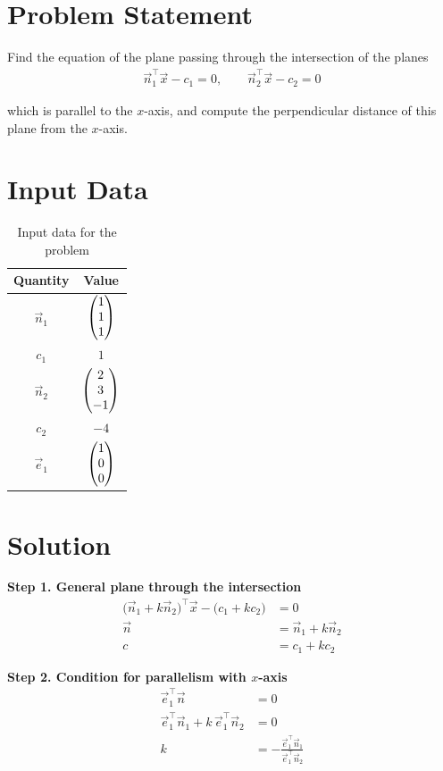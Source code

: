 \documentclass[12pt]{article}
\begin{document}
\section*{Problem Statement}
Find the equation of the plane passing through the intersection of the planes 
\begin{align}
\vec{n}_1^\top \vec{x} - c_1 = 0, 
\qquad
\vec{n}_2^\top \vec{x} - c_2 = 0
\end{align}

which is parallel to the $x$-axis, and compute the perpendicular distance of this plane from the $x$-axis.

\section*{Input Data}
\begin{table}[H]
\centering
\begin{tabular}{|c|c|}
\hline
\textbf{Quantity} & \textbf{Value} \\
\hline
$\vec{n}_1$ & $\begin{pmatrix}1\\1\\1\end{pmatrix}$ \\
\hline
$c_1$ & $1$ \\
\hline
$\vec{n}_2$ & $\begin{pmatrix}2\\3\\-1\end{pmatrix}$ \\
\hline
$c_2$ & $-4$ \\
\hline
$\vec{e}_1$ & $\begin{pmatrix}1\\0\\0\end{pmatrix}$ \\
\hline
\end{tabular}
\caption{Input data for the problem}
\label{}
\end{table}


\section*{Solution}

\textbf{Step 1. General plane through the intersection}
\begin{align}
\big(\vec{n}_1 + k \vec{n}_2\big)^\top \vec{x} - \big(c_1 + k c_2\big) &= 0 \\
\vec{n} &= \vec{n}_1 + k \vec{n}_2 \\
c &= c_1 + k c_2
\end{align}

\textbf{Step 2. Condition for parallelism with $x$-axis}
\begin{align}
\vec{e}_1^\top \vec{n} &= 0 \\
\vec{e}_1^\top \vec{n}_1 + k\, \vec{e}_1^\top \vec{n}_2 &= 0 \\
k &= -\frac{\vec{e}_1^\top \vec{n}_1}{\vec{e}_1^\top \vec{n}_2}
\end{align}
\end{document}
